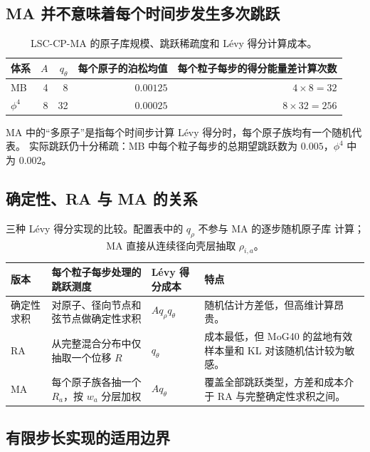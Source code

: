 \documentclass[11pt,a4paper]{article}
\begin{document}
\subsection{MA 并不意味着每个时间步发生多次跳跃}

\begin{table}[H]
\centering
\small
\begin{tabular}{lrrrr}
\toprule
体系 & $A$ & $q_\theta$ & 每个原子的泊松均值 & 每个粒子每步的得分能量差计算次数 \\
\midrule
MB & 4 & 8 & $0.00125$ & $4\times8=32$ \\
$\phi^4$ & 8 & 32 & $0.00025$ & $8\times32=256$ \\
\bottomrule
\end{tabular}
\caption{LSC-CP-MA 的原子库规模、跳跃稀疏度和 Lévy 得分计算成本。}
\end{table}

MA 中的“多原子”是指每个时间步计算 Lévy 得分时，每个原子族均有一个随机代表。
实际跳跃仍十分稀疏：MB 中每个粒子每步的总期望跳跃数为 $0.005$，$\phi^4$ 中为
$0.002$。

\subsection{确定性、RA 与 MA 的关系}

\begin{table}[H]
\centering
\small
\begin{tabularx}{\textwidth}{L{2.4cm}L{4.5cm}C{2.6cm}Y}
\toprule
版本 & 每个粒子每步处理的跳跃测度 & Lévy 得分成本 & 特点 \\
\midrule
确定性求积 &
对原子、径向节点和弦节点做确定性求积 &
$Aq_\rho q_\theta$ &
随机估计方差低，但高维计算昂贵。 \\
RA &
从完整混合分布中仅抽取一个位移 $R$ &
$q_\theta$ &
成本最低，但 MoG40 的盆地有效样本量和 KL 对该随机估计较为敏感。 \\
MA &
每个原子族各抽一个 $R_a$，按 $w_a$ 分层加权 &
$Aq_\theta$ &
覆盖全部跳跃类型，方差和成本介于 RA 与完整确定性求积之间。 \\
\bottomrule
\end{tabularx}
\caption{三种 Lévy 得分实现的比较。配置表中的 $q_\rho$ 不参与 MA 的逐步随机原子库
计算；MA 直接从连续径向壳层抽取 $\rho_{i,a}$。}
\end{table}

\subsection{有限步长实现的适用边界}
\end{document}
